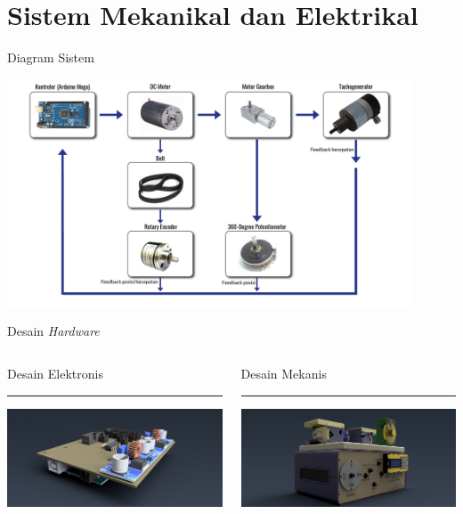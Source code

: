 \documentclass[10pt,xcolor={dvipsnames}]{beamer}
\begin{document}
\section{Sistem Mekanikal dan Elektrikal}
\begin{frame}{Diagram Sistem}
	\begin{center}
		\includegraphics[width=12cm]{Gambar Lain/diagram.png}
	\end{center}
\end{frame}
\begin{frame}{Desain \textit{Hardware}}
	\begin{columns}[T] %
		\begin{column}{0.48\textwidth}
			Desain Elektronis
			\color{black}\rule{\linewidth}{4pt}
			\includegraphics[width=7.5cm]{Render/Main Board_v3 (Home).png}
		\end{column}%
		\hfill%
		\begin{column}{0.48\textwidth}
			Desain Mekanis
			\color{blue}\rule{\linewidth}{4pt}
			\includegraphics[width=7.5cm]{Render/Feedback Actuator UNIT ES151(Home).png}
		\end{column}
	\end{columns}
\end{frame}
\end{document}
